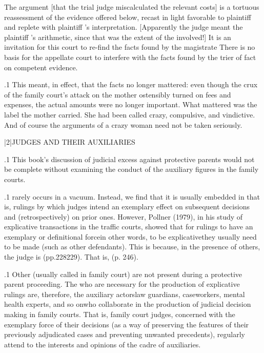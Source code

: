 \documentclass[11pt, twoside]{article}
\begin{document}
{{\begin{blockQuote}
The argument [that the trial judge miscalculated the relevant costs]
is a tortuous reassessment of the evidence offered below, recast in
light favorable to plaintiff and replete with plaintiff ’s interpretation.
[Apparently the judge meant the plaintiff ’s arithmetic, since that
was the extent of the  involved!] It is an invitation
for this court to re-find the facts found by the magistrate\ellFour{2pt}{2pt} There
is no basis for the appellate court to interfere with the facts found
by the trier of fact on competent evidence.
\end{blockQuote}

}%

\p.1{%
This meant, in effect, that the facts no longer mattered: even though
the crux of the family court’s attack on the mother ostensibly turned on
fees and expenses, the actual amounts were no longer important. What
mattered was the label the mother carried. She had been called crazy,
compulsive, and vindictive. And of course the arguments of a crazy
woman need not be taken seriously.
}%


\s|2|{JUDGES AND THEIR AUXILIARIES}

\p.1{%
\noindent{}This book’s discussion of judicial excess against protective parents would
not be complete without examining the conduct of the auxiliary figures
in the family courts.
}%

\p.1{%
 rarely occurs in a vacuum. Instead, we find that it
is usually embedded in \mdash{}that is, rulings by
which judges intend an exemplary effect on subsequent decisions and
(retrospectively) on prior ones. However, Pollner (1979), in his study
of explicative transactions in the traffic courts, showed that for rulings to have an exemplary or definitional force\mdash{}in other words, to
be explicative\mdash{}they usually need to be made  (such as other defendants). This is because, in the presence of
others, the judge is  (pp.\@ 228\ndash{}229). That is, 
(p. 246).
}%

\p.1{%
Other  (usually called  in family court) are
not present during a protective parent proceeding. The  who
are necessary for the production of explicative rulings are, therefore,
the auxiliary actors\mdash{}law guardians, caseworkers, mental health experts,
and so on\mdash{}who collaborate in the production of judicial decision making in family courts. That is, family court judges, concerned with the
exemplary force of their decisions (as a way of preserving the features
of their previously adjudicated cases and preventing unwanted precedents), regularly attend to the interests and opinions of the cadre of
auxiliaries.
}%

}
\end{document}
